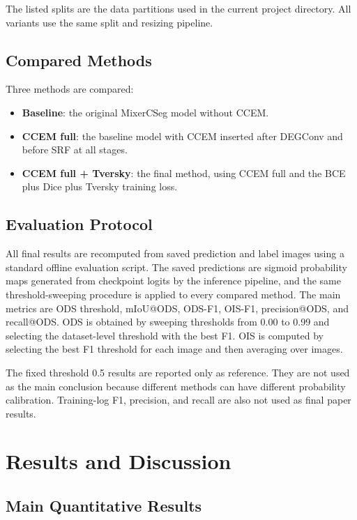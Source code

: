 \documentclass[preprint,12pt]{elsarticle}
\begin{document}
The listed splits are the data partitions used in the current project directory. All variants use the same split and resizing pipeline.

\subsection{Compared Methods}

Three methods are compared:
\begin{itemize}
    \item \textbf{Baseline}: the original MixerCSeg model without CCEM.
    \item \textbf{CCEM full}: the baseline model with CCEM inserted after DEGConv and before SRF at all stages.
    \item \textbf{CCEM full + Tversky}: the final method, using CCEM full and the BCE plus Dice plus Tversky training loss.
\end{itemize}

\subsection{Evaluation Protocol}

All final results are recomputed from saved prediction and label images using a standard offline evaluation script. The saved predictions are sigmoid probability maps generated from checkpoint logits by the inference pipeline, and the same threshold-sweeping procedure is applied to every compared method. The main metrics are ODS threshold, mIoU@ODS, ODS-F1, OIS-F1, precision@ODS, and recall@ODS. ODS is obtained by sweeping thresholds from 0.00 to 0.99 and selecting the dataset-level threshold with the best F1. OIS is computed by selecting the best F1 threshold for each image and then averaging over images.

The fixed threshold 0.5 results are reported only as reference. They are not used as the main conclusion because different methods can have different probability calibration. Training-log F1, precision, and recall are also not used as final paper results.

\section{Results and Discussion}
\label{sec:results}

\subsection{Main Quantitative Results}
\end{document}
